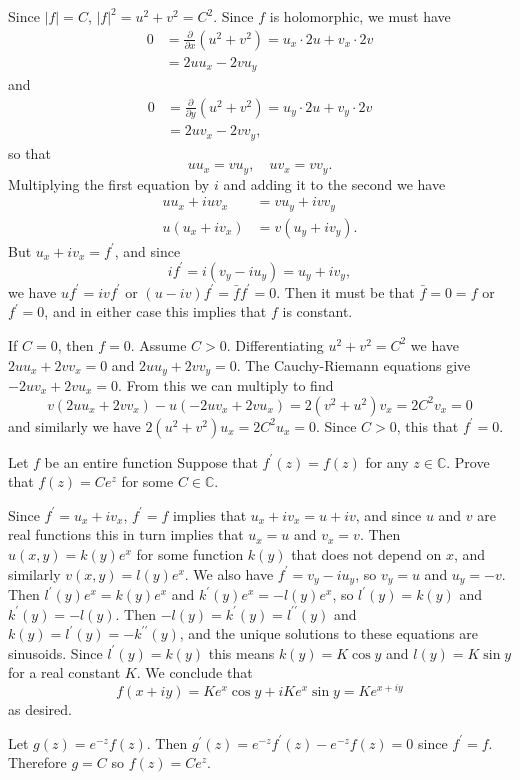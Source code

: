 \documentclass{article}
\newcounter{Problem}
\newenvironment{Problem}{\begin{Exercise}[name={Problem},
                                          counter={Problem}]}
                        {\end{Exercise}}
\begin{document}
\begin{Answer}
  Since $|f| = C$, $|f|^2 = u^2 + v^2 = C^2$. Since $f$ is
  holomorphic, we must have
  \begin{align*}
    0 &= \frac{\partial}{\partial x} (u^2 + v^2)
       = u_x \cdot 2 u + v_x \cdot 2 v \\
      &= 2 u u_x - 2 v u_y
  \end{align*}
  and
  \begin{align*}
    0 &= \frac{\partial}{\partial y} (u^2 + v^2)
       = u_y \cdot 2 u + v_y \cdot 2 v \\
      &= 2 u v_x - 2 v v_y,
  \end{align*}
  so that
  $$
  u u_x = v u_y, \quad
  u v_x = v v_y.
  $$
  Multiplying the first equation by $i$ and adding it to the second we
  have
  \begin{align*}
  u u_x + i u v_x &= v u_y + i v v_y \\
  u (u_x + i v_x) &= v (u_y + i v_y).
  \end{align*}
  But $u_x + i v_x = f^\prime$, and since
  $$
  i f^\prime = i(v_y - i u_y) = u_y + i v_y,
  $$
  we have $u f^\prime = i v f^\prime$ or
  $(u - iv)f^\prime = \bar{f} f^\prime = 0$. Then it must be that
  $\bar{f} = 0 = f$ or $f^\prime = 0$, and in either case this implies that $f$
  is constant.

  If $C = 0$, then $f = 0$. Assume $C > 0$. Differentiating
  $u^2 + v^2 = C^2$ we have $2u u_x + 2 v v_x = 0$ and
  $2 u u_y + 2 v v_y = 0$. The Cauchy-Riemann equations give
  $-2 u v_x + 2 v u_x = 0$. From this we can multiply
  to find
  $$
  v (2u u_x + 2 v v_x) - u(-2 u v_x + 2 v u_x) = 2 (v^2 + u^2) v_x = 2 C^2 v_x = 0
  $$
  and similarly we have $2 (u^2 + v^2) u_x = 2 C^2 u_x = 0$. Since $C > 0$, this
  that $f^\prime = 0$.
\end{Answer}

\begin{Problem}
  Let $f$ be an entire function Suppose that $f^\prime(z) = f(z)$ for
  any $z \in \mathbb{C}$. Prove that $f(z) = C e^z$ for some
  $C \in \mathbb{C}$.
\end{Problem}

\begin{Answer}
Since $f^\prime = u_x + i v_x$, $f^\prime = f$ implies
that $u_x + i v_x = u + i v$, and since $u$ and $v$ are
real functions this in turn implies that $u_x = u$ and
$v_x = v$. Then $u(x, y) = k(y) e^x$ for some function
$k(y)$ that does not depend on $x$, and similarly
$v(x, y) = l(y) e^x$.
We also have $f^\prime = v_y - i u_y$, so
$v_y = u$ and $u_y = -v$. Then
$l^\prime(y) e^x = k(y) e^x$ and
$k^\prime(y) e^x = -l(y) e^x$, so
$l^\prime(y) = k(y)$ and
$k^\prime(y) = -l(y)$. Then
$-l(y) = k^\prime(y) = l^{\prime\prime}(y)$
and $k(y) = l^\prime(y) = -k^{\prime\prime}(y)$, and the unique
solutions to these equations are sinusoids.
Since $l^\prime(y) = k(y)$ this means
$k(y) = K \cos y$ and $l(y) = K \sin y$
for a real constant $K$. We conclude that
$$
  f(x + iy)
= K e^x \cos y + i K e^x \sin y
= K e^{x + iy}
$$
as desired.

Let $g(z) = e^{-z} f(z)$. Then
$g^\prime(z) = e^{-z} f^\prime(z) - e^{-z} f(z) = 0$
since $f^\prime = f$. Therefore $g = C$ so $f(z) = C e^z$.
\end{Answer}
\end{document}
